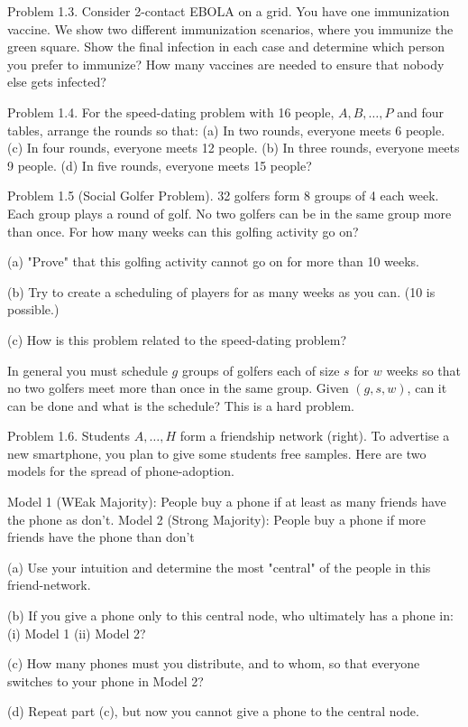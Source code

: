 \documentclass[10pt]{article}
\begin{document}
Problem 1.3. Consider 2-contact EBOLA on a grid. You have one immunization vaccine. We show two different immunization scenarios, where you immunize the green square. Show the final infection in each case and determine which person you prefer to immunize? How many vaccines are needed to ensure that nobody else gets infected?

Problem 1.4. For the speed-dating problem with 16 people, $A, B, \ldots, P$ and four tables, arrange the rounds so that:
(a) In two rounds, everyone meets 6 people.
(c) In four rounds, everyone meets 12 people.
(b) In three rounds, everyone meets 9 people.
(d) In five rounds, everyone meets 15 people?

Problem 1.5 (Social Golfer Problem). 32 golfers form 8 groups of 4 each week. Each group plays a round of golf. No two golfers can be in the same group more than once. For how many weeks can this golfing activity go on?

(a) "Prove" that this golfing activity cannot go on for more than 10 weeks.

(b) Try to create a scheduling of players for as many weeks as you can. (10 is possible.)

(c) How is this problem related to the speed-dating problem?

In general you must schedule $g$ groups of golfers each of size $s$ for $w$ weeks so that no two golfers meet more than once in the same group. Given $(g, s, w)$, can it can be done and what is the schedule? This is a hard problem.

Problem 1.6. Students $A, \ldots, H$ form a friendship network (right). To advertise a new smartphone, you plan to give some students free samples. Here are two models for the spread of phone-adoption.

Model 1 (WEak Majority): People buy a phone if at least as many friends have the phone as don't. Model 2 (Strong Majority): People buy a phone if more friends have the phone than don't

(a) Use your intuition and determine the most "central" of the people in this friend-network.

(b) If you give a phone only to this central node, who ultimately has a phone in: (i) Model 1 (ii) Model 2?

(c) How many phones must you distribute, and to whom, so that everyone switches to your phone in Model 2?

(d) Repeat part (c), but now you cannot give a phone to the central node.
\end{document}
